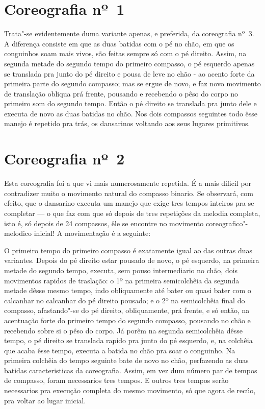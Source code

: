 \section*{Coreografia nº~1}

Trata"-se evidentemente duma variante apenas, e preferida, da coreografia
nº~3. A diferença consiste em que as duas batidas com o pé no chão, em
que os conguinhos soam mais vivos, são feitas sempre só com o pé
direito. Assim, na segunda metade do segundo tempo do primeiro compasso,
o pé esquerdo apenas se translada pra junto do pé direito e pousa de
leve no chão - ao acento forte da primeira parte do segundo compasso;
mas se ergue de novo, e faz novo movimento de translação obliqua prá
frente, pousando e recebendo o pêso do corpo no primeiro som do segundo
tempo. Então o pé direito se translada pra junto dele e executa de novo
as duas batidas no chão. Nos dois compassos seguintes todo êsse manejo é
repetido pra trás, os dansarinos voltando aos seus lugares primitivos.

\section*{Coreografia nº~2}

Esta coreografia foi a que vi mais numerosamente repetida. É a mais
dificil por contradizer muito o movimento natural do compasso binario.
Se observará, com efeito, que o dansarino executa um manejo que exige
tres tempos inteiros pra se completar --- o que faz com que só depois de
tres repetições da melodia completa, isto é, só depois de 24 compassos,
êle se encontre no movimento coreografico"-melodico inicial! A
movimentação é a seguinte:

O primeiro tempo do primeiro compasso é exatamente igual ao das outras
duas variantes. Depois do pé direito estar pousado de novo, o pé
esquerdo, na primeira metade do segundo tempo, executa, sem pouso
intermediario no chão, dois movimentos rapidos de traslação: o 1º na
primeira semicolchêia da segunda metade dêsse mesmo tempo, indo
obliquamente até bater ou quasi bater com o calcanhar no calcanhar do pé
direito pousado; e o 2º na semicolchêia final do compasso, afastando"-se
do pé direito, obliquamente, prá frente, e só então, na acentuação forte
do primeiro tempo do segundo compasso, pousando no chão e recebendo
sobre si o pêso do corpo. Já porêm na segunda semicolchêia dêsse tempo,
o pé direito se translada rapido pra junto do pé esquerdo, e, na
colchêia que acaba êsse tempo, executa a batida no chão pra soar o
conguinho. Na primeira colchêia do tempo seguinte bate de novo no chão,
perfazendo as duas batidas caracteristicas da coreografia. Assim, em vez
dum número par de tempos de compasso, foram necessarios tres tempos. E
outros tres tempos serão necessarios pra execução completa do mesmo
movimento, só que agora de recúo, pra voltar ao lugar inicial.

